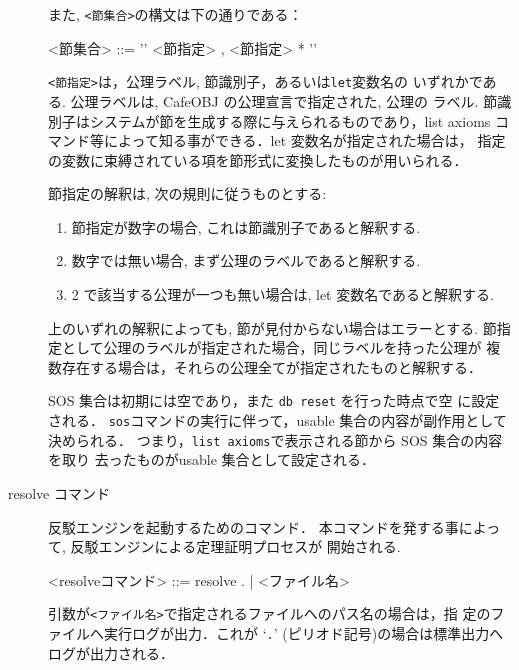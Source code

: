 \begin{description}
  また, \texttt{<節集合>}の構文は下の通りである：

\begin{vvtm}
\begin{simplev}
   <節集合> ::= '{' <節指定> { , <節指定> }* '}'
\end{simplev}
\end{vvtm}

\texttt{<節指定>}は，公理ラベル, 節識別子，あるいは\texttt{let}変数名の
  いずれかである.  公理ラベルは, CafeOBJ の公理宣言で指定された, 公理の
  ラベル. 節識別子はシステムが節を生成する際に与えられるものであり，list
  axioms コマンド等によって知る事ができる．let 変数名が指定された場合は，
  指定の変数に束縛されている項を節形式に変換したものが用いられる．

  節指定の解釈は, 次の規則に従うものとする:
  \begin{enumerate}
  \item 節指定が数字の場合, これは節識別子であると解釈する.
  \item 数字では無い場合, まず公理のラベルであると解釈する.
  \item 2 で該当する公理が一つも無い場合は, let 変数名であると解釈する.
  \end{enumerate}
  上のいずれの解釈によっても, 節が見付からない場合はエラーとする.
  節指定として公理のラベルが指定された場合，同じラベルを持った公理が
  複数存在する場合は，それらの公理全てが指定されたものと解釈する．

  SOS 集合は初期には空であり，また \texttt{db reset} を行った時点で空
  に設定される．
  \texttt{sos}コマンドの実行に伴って，usable 集合の内容が副作用として
  決められる．
  つまり，\texttt{list axioms}で表示される節から SOS 集合の内容を取り
  去ったものがusable 集合として設定される．

\item[resolve コマンド]

  反駁エンジンを起動するためのコマンド．
  本コマンドを発する事によって, 反駁エンジンによる定理証明プロセスが
  開始される.

\begin{vvtm}
\begin{simplev}
  <resolveコマンド> ::= resolve {. | <ファイル名>}
\end{simplev}
\end{vvtm}

引数が\texttt{<ファイル名>}で指定されるファイルへのパス名の場合は，指
  定のファイルへ実行ログが出力．これが `\texttt{.}' (ピリオド記号)の場合は標準出力へ
  ログが出力される．


\end{description}
